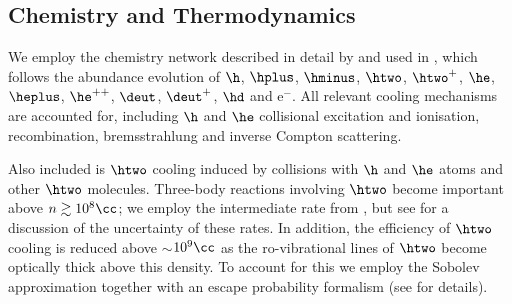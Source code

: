 \subsection{Chemistry and Thermodynamics}
\label{chemistry}
 We employ the chemistry network described in detail by \citet{Greifetal2009b} and used in \citet{Hummeletal2015}, which follows the abundance evolution of $\h$, $\hplus$, $\hminus$, $\htwo$, $\htwo^+$, $\he$, $\heplus$, $\he^{++}$, $\deut$, $\deut^+$, $\hd$ and e$^-$. All relevant cooling mechanisms are accounted for, including $\h$ and $\he$ collisional excitation and ionisation, recombination, bremsstrahlung and inverse Compton scattering. 
 
 Also included is $\htwo$ cooling induced by collisions with $\h$ and $\he$ atoms and other $\htwo$ molecules.  Three-body reactions involving $\htwo$ become important above $n \gtrsim 10^8\cc$; we employ the intermediate rate from \citet{PallaSalpeterStahler1983}, but see \citet{Turketal2011} for a discussion of the uncertainty of these rates.
In addition, the efficiency of $\htwo$ cooling is reduced above $\sim$$10^9\cc$ as the ro-vibrational lines of $\htwo$ become optically thick above this density.  To account for this we employ the Sobolev approximation together with an escape probability formalism (see \citealt{Yoshidaetal2006, Greifetal2011} for details). 